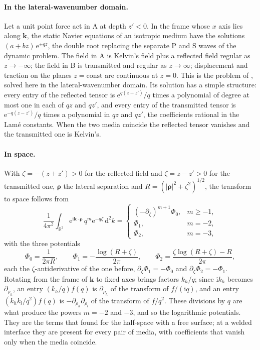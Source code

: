\documentclass[11pt,a4paper]{article}
\newcommand{\bk}{\mathbf{k}}
\newcommand{\brho}{\boldsymbol{\rho}}
\newcommand{\dd}{\mathrm{d}}
\newcommand{\ii}{\mathrm{i}}
\newcommand{\ee}{\mathrm{e}}
\begin{document}
\paragraph{In the lateral-wavenumber domain.} Let a unit point force act in A at depth $z'<0$. In the frame
whose $x$ axis lies along $\bk$, the static Navier equations of an isotropic medium have the solutions
$(a+bz)\,\ee^{\pm qz}$, the double root replacing the separate P and S waves of the dynamic problem. The
field in A is Kelvin's field plus a reflected field regular as $z\to-\infty$; the field in B is transmitted
and regular as $z\to\infty$; displacement and traction on the planes $z=\mathrm{const}$ are continuous at
$z=0$. This is the problem of \citet{Rongved1955}, solved here in the lateral-wavenumber domain. Its
solution has a simple structure: every entry of the reflected tensor is $\ee^{q(z+z')}/q$ times a
polynomial of degree at most one in each of $qz$ and $qz'$, and every entry of the transmitted tensor is
$\ee^{-q(z-z')}/q$ times a polynomial in $qz$ and $qz'$, the coefficients rational in the Lam\'e
constants. When the two media coincide the reflected tensor vanishes and the transmitted one is Kelvin's.

\paragraph{In space.} With $\zeta=-(z+z')>0$ for the reflected field and $\zeta=z-z'>0$ for the transmitted
one, $\brho$ the lateral separation and $R=(|\brho|^2+\zeta^2)^{1/2}$, the transform to space follows from
\begin{equation}\label{eq:imagetransform}
  \frac{1}{4\pi^2}\int_{\mathbb R^2}\ee^{\ii\bk\cdot\brho}\,q^{m}\ee^{-q\zeta}\,\dd^2k
  =\begin{cases}(-\partial_\zeta)^{m+1}\Phi_0,&m\ge-1,\\ \Phi_1,&m=-2,\\ \Phi_2,&m=-3,\end{cases}
\end{equation}
with the three potentials
\begin{equation}\label{eq:potentials}
  \Phi_0=\frac{1}{2\pi R},\qquad\Phi_1=-\frac{\log(R+\zeta)}{2\pi},\qquad\Phi_2=\frac{\zeta\log(R+\zeta)-R}{2\pi},
\end{equation}
each the $\zeta$-antiderivative of the one before, $\partial_\zeta\Phi_1=-\Phi_0$ and
$\partial_\zeta\Phi_2=-\Phi_1$. Rotating from the frame of $\bk$ to fixed axes brings factors $k_h/q$; since
$\ii k_h$ becomes $\partial_{\rho_h}$, an entry $(k_h/q)f(q)$ is $\partial_{\rho_h}$ of the transform of
$f/(\ii q)$, and an entry $(k_hk_l/q^2)f(q)$ is $-\partial_{\rho_h}\partial_{\rho_l}$ of the transform of
$f/q^2$. These divisions by $q$ are what produce the powers $m=-2$ and $-3$, and so the logarithmic
potentials. They are the terms that \citet{Mindlin1936} found for the half-space with a free surface; at a
welded interface they are present for every pair of media, with coefficients that vanish only when the
media coincide.
\end{document}
